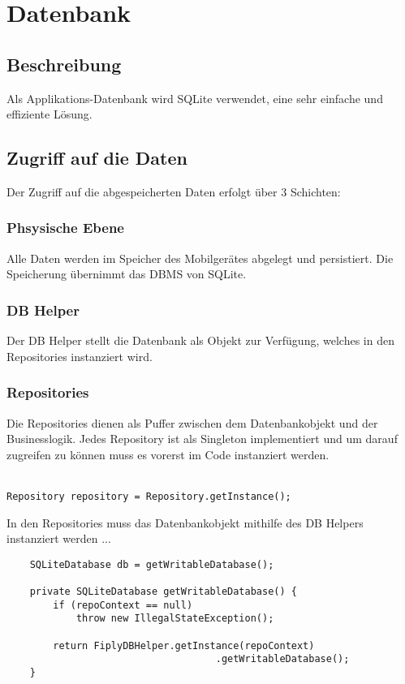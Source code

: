 \documentclass[FIPLY_base.tex]{subfiles}
\author{Gerald Irsiegler}
\date{26. Februar 2016}
\begin{document}
\section{Datenbank}

\subsection{Beschreibung}
Als Applikations-Datenbank wird SQLite verwendet, eine sehr einfache und effiziente Lösung.

\subsection{Zugriff auf die Daten}
Der Zugriff auf die abgespeicherten Daten erfolgt über 3 Schichten:

\subsubsection{Phsysische Ebene}
Alle Daten werden im Speicher des Mobilgerätes abgelegt und persistiert. Die Speicherung übernimmt das DBMS von SQLite.

\subsubsection{DB Helper}
Der DB Helper stellt die Datenbank als Objekt zur Verfügung, welches in den Repositories instanziert wird.


\newpage
\subsubsection{Repositories}
Die Repositories dienen als Puffer zwischen dem Datenbankobjekt und der Businesslogik.
Jedes Repository ist als Singleton implementiert und um darauf zugreifen zu können muss es vorerst im Code instanziert werden.
\\\
\begin{lstlisting}
Repository repository = Repository.getInstance();
\end{lstlisting}



In den Repositories muss das Datenbankobjekt mithilfe des DB Helpers instanziert werden ...

\begin{lstlisting}
    SQLiteDatabase db = getWritableDatabase();

    private SQLiteDatabase getWritableDatabase() {
        if (repoContext == null) 
            throw new IllegalStateException();
	  
        return FiplyDBHelper.getInstance(repoContext)
			      	  		        .getWritableDatabase();
    }
\end{lstlisting}
\end{document}
